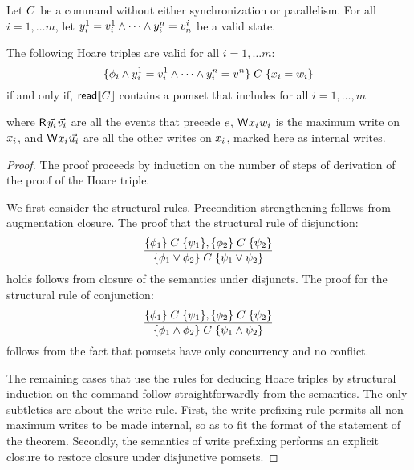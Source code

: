 \begin{theorem}\label{hoareGen}
  Let $C$ be a command without either synchronization or parallelism.
  For all $i=1, \ldots m$, let
  $y^1_i=v^1_i\land\cdots\land y^n_i=v^i_n$ be a valid state.

  The following Hoare triples are valid for all $i=1, \ldots m$:
\begin{displaymath}
  \{\phi_i\land y^1_i=v^1_i\land\cdots\land y^n_i=v^n\}\allowbreak\;C\;\allowbreak\{x_i=w_i\}  
\end{displaymath}
if and only if, ${\mathsf{read}}\llbracket C\rrbracket$ contains a pomset  that includes for all $i=1, \ldots, m$
\begin{tikzdisplay}[node distance=1em]
\end{tikzdisplay}
where $\DR{\vec{\bLoc_i}}{\vec{\aVal_i}}$ are all the events that precede
$e$, $\DW{\aLoc_i}{\bVal_i}$ is the maximum write on $x_i$, and
$\DW{\aLoc_i}{\vec{\dVal_i}}$ are all the other writes on $x_i$, marked
here as internal writes.
\begin{proof}
  The proof proceeds by induction on the number of steps of derivation of the
  proof of the Hoare triple.

  We first consider the structural rules.  Precondition strengthening follows
  from augmentation closure.  The proof that the structural rule of
  disjunction:
  \begin{displaymath}
    \frac{\{\phi_1\}\allowbreak\;C\;\allowbreak\{\psi_1\},  \{\phi_2\}\allowbreak\;C\;\allowbreak\{\psi_2\}}{ \{\phi_1 \lor \phi_2\}\allowbreak\;C\;\allowbreak\{\psi_1\lor \psi_2\}} 
  \end{displaymath}
  holds  follows from closure of the semantics under disjuncts. The proof for the structural rule of conjunction:
  \begin{displaymath}
    \frac{\{\phi_1\}\allowbreak\;C\;\allowbreak\{\psi_1\},  \{\phi_2\}\allowbreak\;C\;\allowbreak\{\psi_2\}}{ \{\phi_1 \land \phi_2\}\allowbreak\;C\;\allowbreak\{\psi_1\land \psi_2\}} 
  \end{displaymath}
  follows from the fact that pomsets have only concurrency and no conflict.  

  The remaining cases that use the rules for deducing Hoare triples by
  structural induction on the command follow straightforwardly from the
  semantics.  The only subtleties are about the write rule.  First, the write
  prefixing rule permits all non-maximum writes to be made internal, so as to
  fit the format of the statement of the theorem.  Secondly, the semantics of
  write prefixing performs an explicit closure to restore closure under
  disjunctive pomsets.
\end{proof}
\end{theorem}



